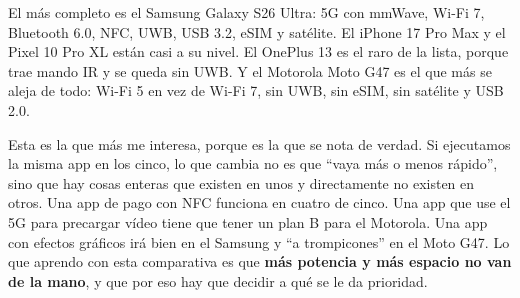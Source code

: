 El más completo es el Samsung Galaxy S26 Ultra: 5G con mmWave, Wi-Fi 7, Bluetooth 6.0, NFC, UWB, USB 3.2, eSIM y satélite. El iPhone 17 Pro Max y el Pixel 10 Pro XL están casi a su nivel. El OnePlus 13 es el raro de la lista, porque trae mando IR y se queda sin UWB. Y el Motorola Moto G47 es el que más se aleja de todo: Wi-Fi 5 en vez de Wi-Fi 7, sin UWB, sin eSIM, sin satélite y USB 2.0.


Esta es la que más me interesa, porque es la que se nota de verdad. Si ejecutamos la misma app en los cinco, lo que cambia no es que \enquote{vaya más o menos rápido}, sino que hay cosas enteras que existen en unos y directamente no existen en otros. Una app de pago con NFC funciona en cuatro de cinco. Una app que use el 5G para precargar vídeo tiene que tener un plan B para el Motorola. Una app con efectos gráficos irá bien en el Samsung y \enquote{a trompicones} en el Moto G47. Lo que aprendo con esta comparativa es que \textbf{más potencia y más espacio no van de la mano}, y que por eso hay que decidir a qué se le da prioridad.
